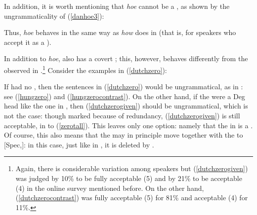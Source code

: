 In addition, it is worth mentioning that \textit{hoe} cannot be a , as shown by the ungrammaticality of (\ref{danhoe3}):

\z

Thus, \textit{hoe} behaves in the same way as \textit{how} does in  (that is, for speakers who accept it as a ).

In addition to \textit{hoe},  also has a covert ; this, however, behaves differently from the  observed in .\footnote{Again, there is considerable variation among speakers but (\ref{dutchzerogiven}) was judged by 10\% to be fully acceptable (5) and by 21\% to be acceptable (4) in the online survey mentioned before. On the other hand, (\ref{dutchzerocontrast}) was fully acceptable (5) for 81\% and acceptable (4) for 11\%.} Consider the examples in (\ref{dutchzero}):

\ea \label{dutchzero}
\z
\z

If  had no , then the sentences in (\ref{dutchzero}) would be ungrammatical, as in : see (\ref{hungzero}) and (\ref{hungzerocontrast}). On the other hand, if the   were a Deg head like the one in , then (\ref{dutchzerogiven}) should be ungrammatical, which is not the case: though marked because of redundancy, (\ref{dutchzerogiven}) is still acceptable, in  to (\ref{zerotall}). This leaves only one option: namely that the  in  is a  . Of course, this also means that the  may in principle move together with the  to [Spec,]: in this case, just like in , it is deleted by .

